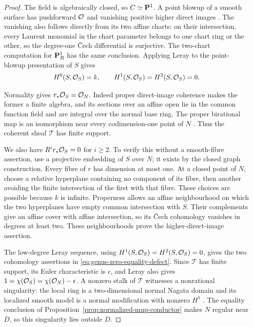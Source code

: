 \begin{proof}
The field is algebraically closed, so $C\simeq\mathbf P^1$.
A point blowup of a smooth surface has pushforward $\mathcal O$ and
vanishing positive higher direct images
\cite[Lemma~54.3.4, Tag~0AGP]{Stacks}.
The vanishing also follows directly from its two affine charts:
on their intersection, every Laurent monomial in the chart parameter
belongs to one chart ring or the other, so the degree-one
\v{C}ech differential is surjective.
The two-chart computation for $\mathbf P^1_R$ has the same conclusion.
Applying Leray to the point-blowup presentation of $S$ gives
\[
 H^0(S,\mathcal O_S)=k,\qquad
 H^1(S,\mathcal O_S)=H^2(S,\mathcal O_S)=0.
\]

Normality gives $r_*\mathcal O_S=\mathcal O_N$. Indeed proper direct-image
coherence \cite[III, Theorem~3.2.1]{EGA} makes the former a
finite algebra, and its sections over an affine open lie in the
common function field and are integral over the normal base ring.
The proper birational map is an isomorphism near every
codimension-one point of $N$ \cite[Tag~0BFP]{Stacks}.
Thus the coherent sheaf $\mathcal T$ has finite support.

We also have $R^ir_*\mathcal O_S=0$ for $i\geq2$.
To verify this without a smooth-fibre assertion, use a projective
embedding of $S$ over $N$; it exists by the closed graph construction.
Every fibre of $r$ has dimension at most one.
At a closed point of $N$, choose a relative hyperplane containing
no component of its fibre, then another avoiding the finite
intersection of the first with that fibre.
These choices are possible because $k$ is infinite.
Properness allows an affine neighbourhood on which the two
hyperplanes have empty common intersection with $S$.
Their complements give an affine cover with affine intersection,
so its \v{C}ech cohomology vanishes in degrees at least two.
These neighbourhoods prove the higher-direct-image assertion.

The low-degree Leray sequence, using
$H^1(S,\mathcal O_S)=H^2(S,\mathcal O_S)=0$, gives the two cohomology assertions
in \eqref{eq:genus-zero-equality-defect}. Since $\mathcal T$
has finite support, its Euler characteristic is $\epsilon$,
and Leray also gives
$1=\chi(\mathcal O_S)=\chi(\mathcal O_N)-\epsilon$.
A nonzero stalk of $\mathcal T$ witnesses a nonrational singularity:
the local ring is a two-dimensional normal Nagata domain and its
localized smooth model is a normal modification with nonzero
$H^1$ \cite[Definition~54.8.3, Tag~0B4N]{Stacks}.
The equality conclusion of
Proposition~\ref{prop:normalized-mup-conductor}
makes $N$ regular near $D$, so this singularity lies outside $D$.


\end{proof}
